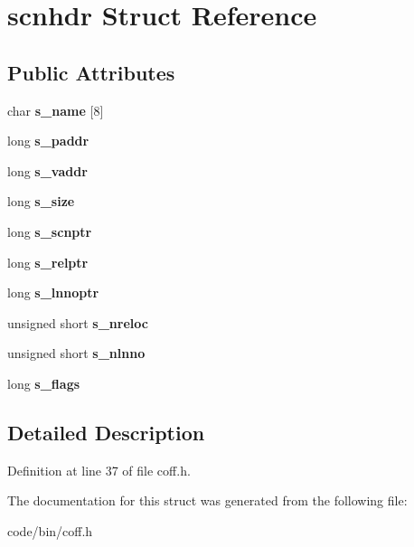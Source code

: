 \section{scnhdr Struct Reference}
\label{structscnhdr}
\subsection*{Public Attributes}
\begin{DoxyCompactItemize}
\item 
char {\bfseries s\+\_\+name} [8]\label{structscnhdr_abe40ce76b9ded81d66e7244b788342c3}

\item 
long {\bfseries s\+\_\+paddr}\label{structscnhdr_ab531808aec071562a3c38b88210084c0}

\item 
long {\bfseries s\+\_\+vaddr}\label{structscnhdr_add2dee0b914b0e29b168679ee8d27a65}

\item 
long {\bfseries s\+\_\+size}\label{structscnhdr_a7cdbb607531d22601dfeb13c712a62e7}

\item 
long {\bfseries s\+\_\+scnptr}\label{structscnhdr_a5603e73e6ac6ada2213af60db249f354}

\item 
long {\bfseries s\+\_\+relptr}\label{structscnhdr_a5fee8394b5d701d2dd438148eac01198}

\item 
long {\bfseries s\+\_\+lnnoptr}\label{structscnhdr_a9801f152881766cad49697e86bcdab41}

\item 
unsigned short {\bfseries s\+\_\+nreloc}\label{structscnhdr_aedc8735ed9399e1a051a143a91f712ac}

\item 
unsigned short {\bfseries s\+\_\+nlnno}\label{structscnhdr_a155b098ec47dcf0b865a3c10d3bf8891}

\item 
long {\bfseries s\+\_\+flags}\label{structscnhdr_a05f6e51576715b386f566f81b52483c0}

\end{DoxyCompactItemize}


\subsection{Detailed Description}


Definition at line 37 of file coff.\+h.



The documentation for this struct was generated from the following file\+:\begin{DoxyCompactItemize}
\item 
code/bin/coff.\+h\end{DoxyCompactItemize}
